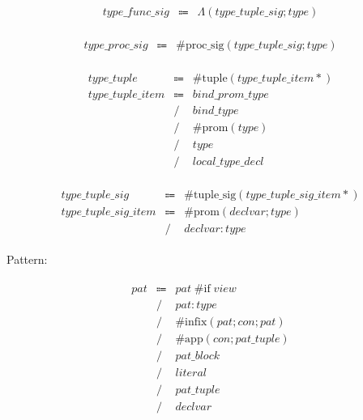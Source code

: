 \begin{align*}
    \begin{array}{rcll}
        \mathit{type\_func\_sig}
        &\Coloneq &\Lambda(\mathit{type\_tuple\_sig}; \mathit{type})
    \end{array}
\end{align*}

\begin{align*}
    \begin{array}{rcll}
        \mathit{type\_proc\_sig}
        &\Coloneq &\mathrm{\#proc\_sig}(\mathit{type\_tuple\_sig}; \mathit{type})
    \end{array}
\end{align*}

\begin{align*}
    \begin{array}{rcll}
        \mathit{type\_tuple}
        &\Coloneq &\mathrm{\#tuple}(\mathit{type\_tuple\_item}{*}) \\
        \mathit{type\_tuple\_item}
        &\Coloneq &\mathit{bind\_prom\_type} \\
        &\mathrel{/} &\mathit{bind\_type} \\
        &\mathrel{/} &\mathrm{\#prom}(\mathit{type}) \\
        &\mathrel{/} &\mathit{type} \\
        &\mathrel{/} &\mathit{local\_type\_decl}
    \end{array}
\end{align*}

\begin{align*}
    \begin{array}{rcll}
        \mathit{type\_tuple\_sig}
        &\Coloneq &\mathrm{\#tuple\_sig}(\mathit{type\_tuple\_sig\_item}{*}) \\
        \mathit{type\_tuple\_sig\_item}
        &\Coloneq &\mathrm{\#prom}(\mathit{declvar}; \mathit{type}) \\
        &\mathrel{/} &\mathit{declvar}: \mathit{type}
    \end{array}
\end{align*}

Pattern:

\begin{align*}
    \begin{array}{rcll}
        \mathit{pat}
        &\Coloneq &\mathit{pat}\; \mathrm{\#if}\; \mathit{view} \\
        &\mathrel{/} &\mathit{pat}: \mathit{type} \\
        &\mathrel{/} &\mathrm{\#infix}(\mathit{pat}; \mathit{con}; \mathit{pat}) \\
        &\mathrel{/} &\mathrm{\#app}(\mathit{con}; \mathit{pat\_tuple}) \\
        &\mathrel{/} &\mathit{pat\_block} \\
        &\mathrel{/} &\mathit{literal} \\
        &\mathrel{/} &\mathit{pat\_tuple} \\
        &\mathrel{/} &\mathit{declvar}
    \end{array}
\end{align*}


